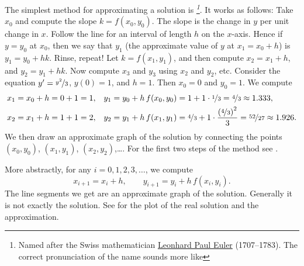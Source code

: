 The simplest method for approximating a solution is
\emph{%
\footnote{Named after the Swiss mathematician
\href{https://en.wikipedia.org/wiki/Euler}{Leonhard Paul Euler}
(1707--1783).  The correct pronunciation of the name sounds more
like }}.  It works as follows:
Take $x_0$ and compute the slope $k = f(x_0,y_0)$.  The slope is the
change in $y$ per unit change in $x$.  Follow the line for an interval of
length $h$ on the $x$-axis.  Hence if $y = y_0$ at $x_0$, then we say that
$y_1$ (the approximate value of $y$ at $x_1 = x_0 + h$) is
$y_1 = y_0 + h k$.
Rinse, repeat!  Let $k = f(x_1,y_1)$, and then compute
$x_2 = x_1 + h$, and $y_2 = y_1 + h k$.
Now compute $x_3$ and $y_3$ using $x_2$ and $y_2$, etc.
Consider the equation $y' = \nicefrac{y^2}{3}$, $y(0)=1$, and $h=1$.
Then $x_0=0$ and $y_0 = 1$.  We compute
\begin{align*}
& x_1 = x_0 + h = 0 + 1 = 1, & & y_1 = y_0 + h \, f(x_0,y_0) = 1 + 1 \cdot
\nicefrac{1}{3} = \nicefrac{4}{3} \approx 1.333,\\
& x_2 = x_1 + h = 1 + 1 = 2, & & y_2 = y_1 + h \, f(x_1,y_1) =
\nicefrac{4}{3} + 1 \cdot \frac{{(\nicefrac{4}{3})}^2}{3} =
\nicefrac{52}{27} \approx 1.926.
\end{align*}
We then draw an approximate graph of the solution by
connecting the points
$(x_0,y_0)$,
$(x_1,y_1)$,
$(x_2,y_2)$,\dots.
For the first two steps of the method see
.

\begin{myfig}
\capstart
\caption{First two steps of Euler's method with $h=1$ for
the equation $y' = \frac{y^2}{3}$ with initial conditions $y(0)=1$.%
\label{euler-step12:fig}}
\end{myfig}

More abstractly, for any $i=0,1,2,3,\ldots$, we compute
\begin{equation*}
x_{i+1} = x_i + h , \qquad y_{i+1}  = y_i + h\, f(x_i,y_i) .
\end{equation*}
The line segments we get are an
approximate graph of the solution.
Generally it is not exactly the solution.  See
 for the plot of the real solution
and the approximation.

\begin{myfig}
\capstart
{}
\caption{Two steps of Euler's method (step size 1) and the exact solution for
the equation $y' = \frac{y^2}{3}$ with initial conditions $y(0)=1$.
%
\label{euler-step12-sol:fig}}
\end{myfig}

